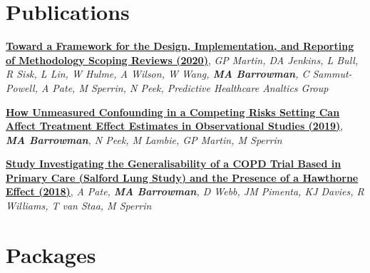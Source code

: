 \documentclass[11pt]{article}
\newcommand{\blue}[1]{\textcolor{MyBlue1}{#1}}
\begin{document}


\section{Publications}
\newcommand{\publication}[4]{
\href{#4}{\blue{\textbf{#1 (#2)}}}, \textit{#3}
}

\publication{Toward a Framework for the Design, Implementation, and Reporting of Methodology Scoping Reviews}{2020}{GP Martin, DA Jenkins, L Bull, R Sisk, L Lin, W Hulme, A Wilson, W Wang, \textbf{MA Barrowman}, C Sammut-Powell, A Pate, M Sperrin, N Peek, Predictive Healthcare Analtics Group}{https://doi.org/10.1016/j.jclinepi.2020.07.014}

\publication{How Unmeasured Confounding in a Competing Risks Setting Can Affect Treatment Effect Estimates in Observational Studies}{2019}{\textbf{MA Barrowman}, N Peek, M Lambie, GP Martin, M Sperrin}{https://doi.org/10.1186/s12874-019-0808-7}


\publication{Study Investigating the Generalisability of a COPD Trial Based in Primary Care (Salford Lung Study) and the Presence of a Hawthorne Effect}{2018}{A Pate, \textbf{MA Barrowman}, D Webb, JM Pimenta, KJ Davies, R Williams, T van Staa, M Sperrin}{https://doi.org/10.1136/bmjresp-2018-000339}

\section{Packages}

\newcommand{\Lpackage}[3]{
\begin{tabularx}{\textwidth}{m{2.2cm}Z}
\texttt{[image: imgs/\#1]} &
\href{#2}{\textbf{\blue{#1}}} #3
\end{tabularx}
}
\end{document}
